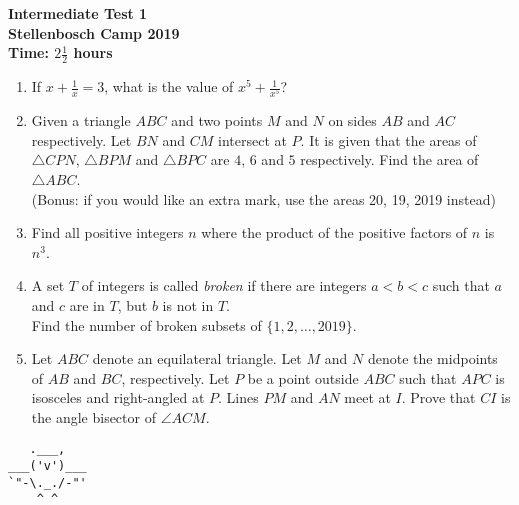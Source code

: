 \documentclass{article}
\begin{document}
\thispagestyle{empty}

\begin{center}
  \textbf{\Large Intermediate Test 1}
  \\ \vspace{1em}
  \textbf{\large Stellenbosch Camp 2019}
  \\ \vspace{1em}
  \textbf{\large Time: $2\frac{1}{2}$ hours}
\end{center}

\vspace{6.81mm}

\begin{enumerate}[1.]

\item %
If $x + \frac{1}{x} = 3$, what is the value of $x^5 + \frac{1}{x^5}$?\\
\vspace{6.81mm}

\item %
Given a triangle $ABC$ and two points $M$ and $N$ on sides $AB$ and $AC$ respectively. Let $BN$ and $CM$ intersect at $P$. It is given that the areas of $\triangle CPN$, $\triangle BPM$ and $\triangle BPC$ are $4$, $6$ and $5$ respectively.
Find the area of $\triangle ABC$.\\
(Bonus: if you would like an extra mark, use the areas 20, 19, 2019 instead)\\
\vspace{6.81mm}

\item %
Find all positive integers $n$ where the product of the positive factors of $n$ is $n^3$.\\
\vspace{6.81mm}

\item %
A set $T$ of integers is called \textit{broken} if there are integers $a < b < c$ such that $a$ and $c$ are in $T$, but $b$ is not in $T$.\\
Find the number of broken subsets of $\{1, 2, \dots, 2019\}$.\\
\vspace{6.81mm}

\item %
Let $ABC$ denote an equilateral triangle. Let $M$ and $N$ denote the midpoints of $AB$ and $BC$, respectively.
Let $P$ be a point outside $ABC$ such that $APC$ is isosceles and right-angled at $P$. Lines $PM$ and $AN$ meet at $I$.
Prove that $CI$ is the angle bisector of $\angle ACM$.\\

\end{enumerate}


\vfill
\begin{center} \begin{BVerbatim}
   .___,   
___('v')___
`"-\._./-"'
    ^ ^ 
  
\end{BVerbatim} \end{center}
\end{document}
